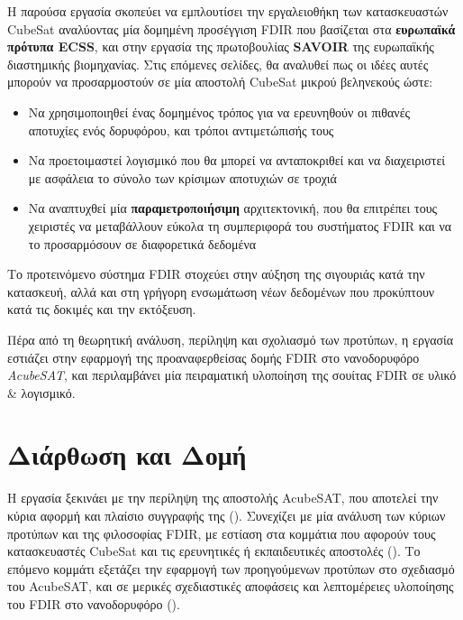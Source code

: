 \documentclass[a4paper,nobib]{tufte-book}
\begin{document}
Η παρούσα εργασία σκοπεύει να εμπλουτίσει την εργαλειοθήκη των κατασκευαστών CubeSat αναλύοντας μία δομημένη προσέγγιση \ac{FDIR} που βασίζεται στα \textbf{ευρωπαϊκά πρότυπα \acs{ECSS}}, και στην εργασία της πρωτοβουλίας \textbf{\acs{SAVOIR}} της ευρωπαϊκής διαστημικής βιομηχανίας. Στις επόμενες σελίδες, θα αναλυθεί πως οι ιδέες αυτές μπορούν να προσαρμοστούν σε μία αποστολή CubeSat μικρού βεληνεκούς ώστε:
\begin{itemize}
	\item Να χρησιμοποιηθεί ένας δομημένος τρόπος για να ερευνηθούν οι πιθανές αποτυχίες ενός δορυφόρου, και τρόποι αντιμετώπισής τους
	\item Να προετοιμαστεί λογισμικό που θα μπορεί να ανταποκριθεί και να διαχειριστεί με ασφάλεια το σύνολο των κρίσιμων αποτυχιών σε τροχιά
	\item Να αναπτυχθεί μία \textbf{παραμετροποιήσιμη} αρχιτεκτονική, που θα επιτρέπει τους χειριστές να μεταβάλλουν εύκολα τη συμπεριφορά του συστήματος \acs{FDIR} και να το προσαρμόσουν σε διαφορετικά δεδομένα
\end{itemize}

Το προτεινόμενο σύστημα \acs{FDIR} στοχεύει στην αύξηση της σιγουριάς κατά την κατασκευή, αλλά και στη γρήγορη ενσωμάτωση νέων δεδομένων που προκύπτουν κατά τις δοκιμές και την εκτόξευση.

Πέρα από τη θεωρητική ανάλυση, περίληψη και σχολιασμό των προτύπων, η εργασία εστιάζει στην εφαρμογή της προαναφερθείσας δομής \acs{FDIR} στο νανοδορυφόρο \emph{AcubeSAT}, και περιλαμβάνει μία πειραματική υλοποίηση της σουίτας \acs{FDIR} σε υλικό \& λογισμικό.


\section{Διάρθωση και Δομή}

Η εργασία ξεκινάει με την περίληψη της αποστολής AcubeSAT, που αποτελεί την κύρια αφορμή και πλαίσιο συγγραφής της (). Συνεχίζει με μία ανάλυση των κύριων προτύπων και της φιλοσοφίας \acs{FDIR}, με εστίαση στα κομμάτια που αφορούν τους κατασκευαστές CubeSat και τις ερευνητικές ή εκπαιδευτικές αποστολές (). Το επόμενο κομμάτι εξετάζει την εφαρμογή των προηγούμενων προτύπων στο σχεδιασμό του AcubeSAT, και σε μερικές σχεδιαστικές αποφάσεις και λεπτομέρειες υλοποίησης του \acs{FDIR} στο νανοδορυφόρο ().
\end{document}

